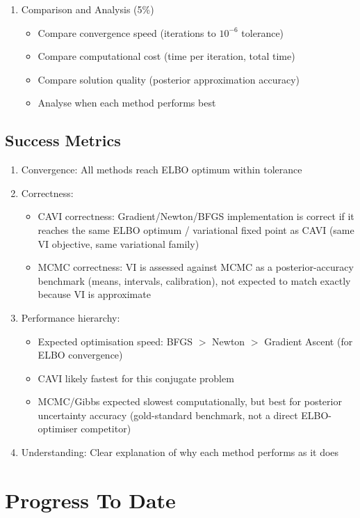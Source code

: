 \documentclass[11pt]{article}
\begin{document}
\begin{enumerate}[leftmargin=*]
\item Comparison and Analysis (5\%)
\begin{itemize}
\item Compare convergence speed (iterations to $10^{-6}$ tolerance)
\item Compare computational cost (time per iteration, total time)
\item Compare solution quality (posterior approximation accuracy)
\item Analyse when each method performs best
\end{itemize}
\end{enumerate}

\subsection*{Success Metrics}

\begin{enumerate}
\item Convergence: All methods reach ELBO optimum within tolerance
\item Correctness:
\begin{itemize}
\item CAVI correctness: Gradient/Newton/BFGS implementation is correct if it reaches the same ELBO optimum / variational fixed point as CAVI (same VI objective, same variational family)
\item MCMC correctness: VI is assessed against MCMC as a posterior-accuracy benchmark (means, intervals, calibration), not expected to match exactly because VI is approximate
\end{itemize}
\item Performance hierarchy:
\begin{itemize}
\item Expected optimisation speed: BFGS $>$ Newton $>$ Gradient Ascent (for ELBO convergence)
\item CAVI likely fastest for this conjugate problem
\item MCMC/Gibbs expected slowest computationally, but best for posterior uncertainty accuracy (gold-standard benchmark, not a direct ELBO-optimiser competitor)
\end{itemize}
\item Understanding: Clear explanation of why each method performs as it does
\end{enumerate}
\newpage
\section*{Progress To Date}
\end{document}
